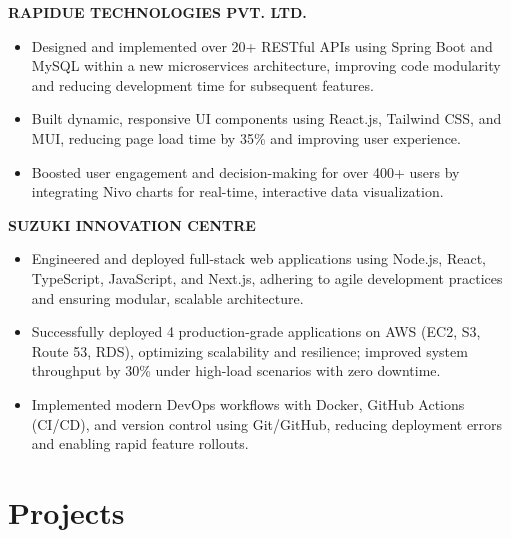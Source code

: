 \documentclass[letterpaper,10pt]{article}
\newcommand{\runsubsection}[1]{
  \color{subheadings}\fontsize{11pt}{13pt}\selectfont\bfseries\uppercase{#1}\normalfont
}
\newcommand{\descript}[1]{
  \color{subheadings}\raggedright\scshape\fontsize{10pt}{12pt}\selectfont{#1\\}\normalfont
}
\newcommand{\location}[1]{
  \color{headings}\raggedright\fontsize{9pt}{11pt}\selectfont{#1\\}\normalfont
}
\newenvironment{tightitemize}{
  \vspace{2pt}\begin{itemize}[leftmargin=12pt]\itemsep1pt \parskip0pt \parsep0pt
}{
  \end{itemize}\vspace{-\topsep}
}
\newcommand{\sectionsep}{\vspace{6pt}}
\begin{document}
\begin{minipage}[t]{0.66\textwidth}
\begin{tightitemize}
\end{tightitemize}
\sectionsep

\runsubsection{Rapidue Technologies Pvt. Ltd.}
\descript{| Software Developer}
\location{2024-02 -- 2025-04 | Hyderabad, Telangana}
\begin{tightitemize}

\item Designed and implemented over 20+ RESTful APIs using Spring Boot and MySQL within a new microservices architecture, improving code modularity and reducing development time for subsequent features.

\item Built dynamic, responsive UI components using React.js, Tailwind CSS, and MUI, reducing page load time by 35\% and improving user experience.

\item Boosted user engagement and decision-making for over 400+ users by integrating Nivo charts for real-time, interactive data visualization.

\end{tightitemize}
\sectionsep

\runsubsection{Suzuki Innovation Centre}
\descript{| Software Developer}
\location{2023-07 -- 2024-01 | Hyderabad, Telangana}
\begin{tightitemize}

\item Engineered and deployed full-stack web applications using Node.js, React, TypeScript, JavaScript, and Next.js, adhering to agile development practices and ensuring modular, scalable architecture.

\item Successfully deployed 4 production-grade applications on AWS (EC2, S3, Route 53, RDS), optimizing scalability and resilience; improved system throughput by 30\% under high-load scenarios with zero downtime.

\item Implemented modern DevOps workflows with Docker, GitHub Actions (CI/CD), and version control using Git/GitHub, reducing deployment errors and enabling rapid feature rollouts.

\end{tightitemize}
\sectionsep




\section{Projects}



\end{minipage}
\end{document}
